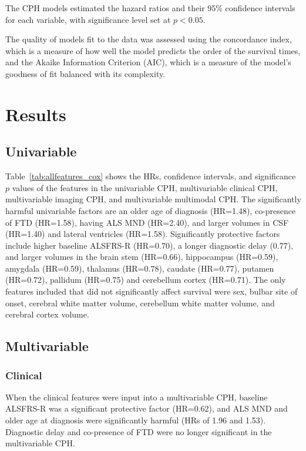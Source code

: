
The CPH models estimated the hazard ratios and their 95\% confidence intervals for each variable, with significance level set at $p<0.05$.

The quality of models fit to the data was assessed using the concordance index, which is a measure of how well the model predicts the order of the survival times, and the Akaike Information Criterion (AIC), which is a measure of the model's goodness of fit balanced with its complexity.

\section{Results}

\subsection{Univariable}



Table~\ref{tab:allfeatures_cox} shows the HRs, confidence intervals, and significance $p$ values of the features in the univariable CPH, multivariable clinical CPH, multivariable imaging CPH, and multivariable multimodal CPH.
The significantly harmful univariable factors are an older age of diagnosis (HR=1.48), co-presence of FTD (HR=1.58), having ALS MND (HR=2.40), and larger volumes in CSF (HR=1.40) and lateral ventricles (HR=1.58).
Significantly protective factors include higher baseline ALSFRS-R (HR=0.70), a longer diagnostic delay (0.77), and larger volumes in the brain stem (HR=0.66), hippocampus (HR=0.59), amygdala (HR=0.59), thalamus (HR=0.78), caudate (HR=0.77), putamen (HR=0.72), pallidum (HR=0.75) and cerebellum cortex (HR=0.71).
The only features included that did not significantly affect survival were sex, bulbar site of onset, cerebral white matter volume, cerebellum white matter volume, and cerebral cortex volume.


\subsection{Multivariable}

\subsubsection{Clinical}
When the clinical features were input into a multivariable CPH, baseline ALSFRS-R was a significant protective factor (HR=0.62), and ALS MND and older age at diagnosis were significantly harmful (HRs of 1.96 and 1.53). 
Diagnostic delay and co-presence of FTD were no longer significant in the multivariable CPH.

